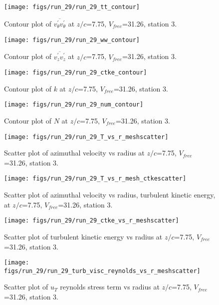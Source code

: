 \begin{figure}[H]
\centering
\texttt{[image: figs/run\_29/run\_29\_tt\_contour]}
\caption{Contour plot of $\overline{v_{\theta}^{\prime} v_{\theta}^{\prime}}$ at $z/c$=7.75, $V_{free}$=31.26, station 3.}
\end{figure}


\begin{figure}[H]
\centering
\texttt{[image: figs/run\_29/run\_29\_ww\_contour]}
\caption{Contour plot of $\overline{v_{z}^{\prime} v_{z}^{\prime}}$ at $z/c$=7.75, $V_{free}$=31.26, station 3.}
\end{figure}


\begin{figure}[H]
\centering
\texttt{[image: figs/run\_29/run\_29\_ctke\_contour]}
\caption{Contour plot of $k$ at $z/c$=7.75, $V_{free}$=31.26, station 3.}
\end{figure}


\begin{figure}[H]
\centering
\texttt{[image: figs/run\_29/run\_29\_num\_contour]}
\caption{Contour plot of $N$ at $z/c$=7.75, $V_{free}$=31.26, station 3.}
\end{figure}


\begin{figure}[H]
\centering
\texttt{[image: figs/run\_29/run\_29\_T\_vs\_r\_meshscatter]}
\caption{Scatter plot of azimuthal velocity vs radius at $z/c$=7.75, $V_{free}$=31.26, station 3.}
\end{figure}


\begin{figure}[H]
\centering
\texttt{[image: figs/run\_29/run\_29\_T\_vs\_r\_mesh\_ctkescatter]}
\caption{Scatter plot of azimuthal velocity vs radius, turbulent kinetic energy, at $z/c$=7.75, $V_{free}$=31.26, station 3.}
\end{figure}


\begin{figure}[H]
\centering
\texttt{[image: figs/run\_29/run\_29\_ctke\_vs\_r\_meshscatter]}
\caption{Scatter plot of turbulent kinetic energy vs radius at $z/c$=7.75, $V_{free}$=31.26, station 3.}
\end{figure}


\begin{figure}[H]
\centering
\texttt{[image: figs/run\_29/run\_29\_turb\_visc\_reynolds\_vs\_r\_meshscatter]}
\caption{Scatter plot of $
u_T$ reynolds stress term vs radius at $z/c$=7.75, $V_{free}$=31.26, station 3.}
\end{figure}


